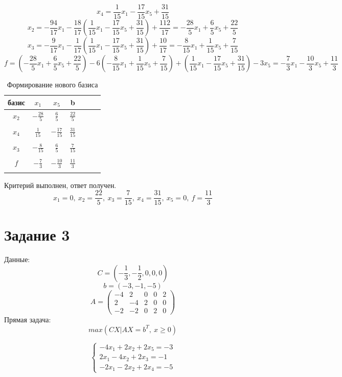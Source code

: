 \documentclass{article}
\begin{document}
\[x_4 = \frac{1}{15}x_1 - \frac{17}{15}x_5 +\frac{31}{15}\]
\[x_2 = - \frac{94}{17}x_1 - \frac{18}{17}(\frac{1}{15}x_1 - \frac{17}{15}x_5 +\frac{31}{15}) +\frac{112}{17} = 
-\frac{28}{5}x_1+\frac{6}{5}x_5 +\frac{22}{5}
\]
\[x_3 = -\frac{9}{17}x_1 -\frac{1}{17}(\frac{1}{15}x_1 - \frac{17}{15}x_5 +\frac{31}{15}) +\frac{10}{17} = 
-\frac{8}{15}x_1 + \frac{1}{15}x_5 +\frac{7}{15}
\]
\[f = (-\frac{28}{5}x_1+\frac{6}{5}x_5 +\frac{22}{5})-6(-\frac{8}{15}x_1 + \frac{1}{15}x_5 +\frac{7}{15})+(\frac{1}{15}x_1 - \frac{17}{15}x_5 +\frac{31}{15})-3x_5 = 
-\frac{7}{3}x_1 - \frac{10}{3}x_5 +\frac{11}{3}\]

\begin{table}[H]
    \centering
    \caption{Формирование нового базиса}
    \begin{tabular}{|c|c|c|c|c|c|c|}
    \hline
        базис   & $x_1$            & $x_5$             & b \\ \hline
        $x_2$ 	&$-\frac{28}{5}$  &$\frac{6}{5}$	&$\frac{22}{5}$ \\
        &&& \\
        $x_4$ 	&$\frac{1}{15}$	   &$- \frac{17}{15}$&	$\frac{31}{15}$ \\
        &&& \\
        $x_3$  	&$-\frac{8}{15}$   &$\frac{6}{5}$	&$\frac{7}{15}$ \\
        &&& \\
        $f$  	&$-\frac{7}{3}$	&$- \frac{10}{3}$	&$\frac{11}{3}$ \\
        &&& \\ \hline
    \end{tabular}
\end{table}
Критерий выполнен, ответ получен. 
\[x_1 = 0,\ x_2 = \frac{22}{5}, \ x_3 = \frac{7}{15},\ x_4 = \frac{31}{15},\ x_5 = 0,\ f = \frac{11}{3}\]



\section*{Задание 3}

Данные:
\[C = (-\frac{1}{3}, -\frac{1}{2}, 0, 0, 0)\]
\[b = (-3, -1 ,-5)\]
\[A = \begin{pmatrix}
    -4&2&0&0&2\\
    2&-4&2&0&0\\
    -2&-2&0&2&0
\end{pmatrix}\]
Прямая задача:
\[max(CX|AX = b^T,\ x\geq 0)\]

\[\begin{cases}
    -4x_1+2x_2+2x_5 = -3\\
    2x_1 -4x_2+2x_3 = -1\\
    -2x_1-2x_2+2x_4 = -5
\end{cases}\]
\end{document}
